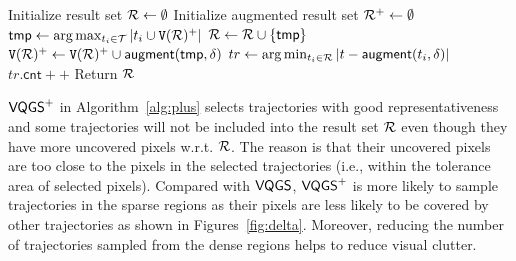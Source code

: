 %
\begin{algorithm}
    \caption{$\vatss(\D,k=\lceil \alpha \mathcal{T} \rceil,\delta)$} \label{alg:plus}
    \begin{algorithmic}[1]
    \State Initialize result set $\mathcal{R} \leftarrow \emptyset$
    \State Initialize augmented result set $\mathcal{R}^{+} \leftarrow \emptyset$
        \State $\mathsf{tmp} \leftarrow \arg\max_{t_i \in \mathcal{T}} | t_i  \cup \mathtt{V}(\mathcal{R})^{+} |$ \label{line:deltamax}
        \State $\mathcal{R} \leftarrow \mathcal{R} \cup \{ \mathsf{tmp} \}$
        \State $\mathtt{V}(\mathcal{R})^{+} \leftarrow \mathtt{V}(\mathcal{R})^{+} \cup \mathsf{augment}(\mathsf{tmp}, \delta)$\label{line:delta}
    \EndWhile
      \label{line:s}
        \State $tr \leftarrow \arg\min_{t_i \in \mathcal{R}}{|t-\mathsf{augment}(t_i, \delta)|}$
        \State $tr.\mathsf{cnt}++$ \label{line:e}
    \EndFor
    \State Return $\mathcal{R}$
    \end{algorithmic}
\end{algorithm}




$\mathsf{VQGS}^+$ in Algorithm~\ref{alg:plus} selects trajectories with good representativeness and some trajectories will not be included into the result set $\mathcal{R}$ even though they have more uncovered pixels w.r.t. $\mathcal{R}$.
The reason is that their uncovered pixels are too close to the pixels in the selected trajectories (i.e., within the tolerance area of selected pixels).
Compared with $\mathsf{VQGS}$, $\mathsf{VQGS}^+$ is more likely to sample trajectories in the sparse regions as their pixels are less likely to be covered by other trajectories as shown in Figures~\ref{fig:delta}.
Moreover, reducing the number of trajectories sampled from the dense regions helps to reduce visual clutter.



